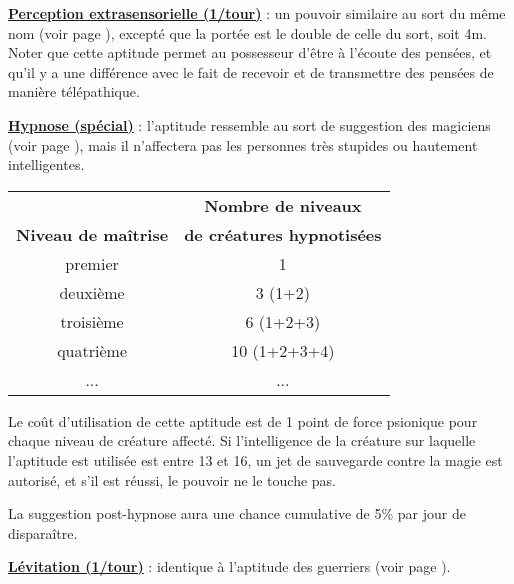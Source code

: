\bigskip

\label{magicien-ESP}\textbf{\uline{Perception extrasensorielle (1/tour)}} : un pouvoir similaire au sort du même nom (voir page \pageref{sort-esp}), excepté que la portée est le double de celle du sort, soit 4m. Noter que cette aptitude permet au possesseur d'être \og à l'écoute \fg{} des pensées, et qu'il y a une différence avec le fait de recevoir et de transmettre des pensées de manière télépathique.

\bigskip

\label{magicien-hypnose}\textbf{\uline{Hypnose (spécial)}} : l'aptitude ressemble au sort de suggestion des magiciens (voir page \pageref{sort-suggestion}), mais il n'affectera pas les personnes très stupides ou hautement intelligentes.

\bigskip

\begin{tabular}{cc}
                            &\textbf{Nombre de niveaux} \\
\textbf{Niveau de maîtrise} & \textbf{de créatures hypnotisées}\\
premier     & 1   \\
deuxième    & 3 (1+2)   \\
troisième   & 6 (1+2+3)  \\
quatrième   & 10 (1+2+3+4) \\
...         & ...    \\
\end{tabular}

\bigskip

Le coût d'utilisation de cette aptitude est de 1 point de force psionique pour chaque niveau de créature affecté. Si l'intelligence de la créature sur laquelle l'aptitude est utilisée est entre 13 et 16, un jet de sauvegarde contre la magie est autorisé, et s'il est réussi, le pouvoir ne le touche pas.

\bigskip

La suggestion post-hypnose aura une chance cumulative de 5\% par jour de disparaître.

\bigskip

\textbf{\uline{Lévitation (1/tour)}} : identique à l'aptitude des guerriers (voir page \pageref{guerrier-levitation}).

